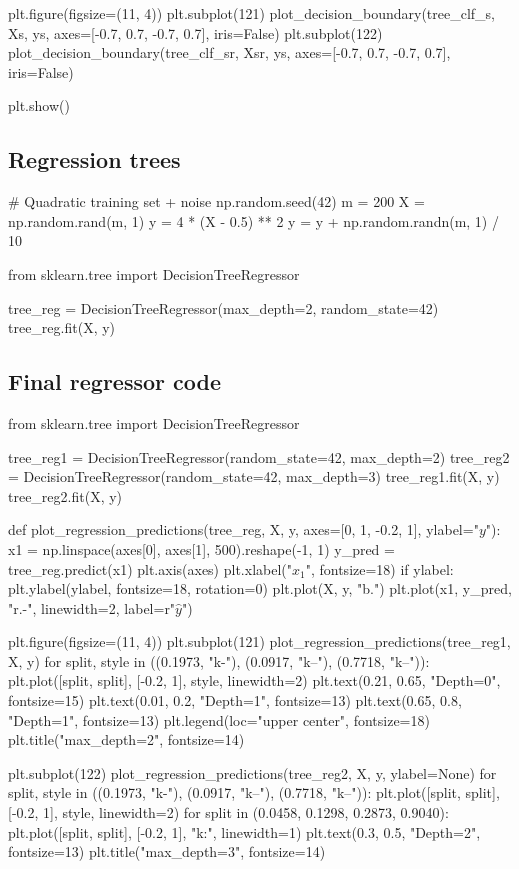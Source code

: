 \documentclass[%
oneside,                 %
final,                   %
10pt]{article}
\begin{document}
plt.figure(figsize=(11, 4))
plt.subplot(121)
plot_decision_boundary(tree_clf_s, Xs, ys, axes=[-0.7, 0.7, -0.7, 0.7], iris=False)
plt.subplot(122)
plot_decision_boundary(tree_clf_sr, Xsr, ys, axes=[-0.7, 0.7, -0.7, 0.7], iris=False)

plt.show()
\epycod

\subsection{Regression trees}
\bpycod
# Quadratic training set + noise
np.random.seed(42)
m = 200
X = np.random.rand(m, 1)
y = 4 * (X - 0.5) ** 2
y = y + np.random.randn(m, 1) / 10
\epycod

\bpycod
from sklearn.tree import DecisionTreeRegressor

tree_reg = DecisionTreeRegressor(max_depth=2, random_state=42)
tree_reg.fit(X, y)
\epycod

\subsection{Final regressor code}
\bpycod
from sklearn.tree import DecisionTreeRegressor

tree_reg1 = DecisionTreeRegressor(random_state=42, max_depth=2)
tree_reg2 = DecisionTreeRegressor(random_state=42, max_depth=3)
tree_reg1.fit(X, y)
tree_reg2.fit(X, y)

def plot_regression_predictions(tree_reg, X, y, axes=[0, 1, -0.2, 1], ylabel="$y$"):
    x1 = np.linspace(axes[0], axes[1], 500).reshape(-1, 1)
    y_pred = tree_reg.predict(x1)
    plt.axis(axes)
    plt.xlabel("$x_1$", fontsize=18)
    if ylabel:
        plt.ylabel(ylabel, fontsize=18, rotation=0)
    plt.plot(X, y, "b.")
    plt.plot(x1, y_pred, "r.-", linewidth=2, label=r"$\hat{y}$")

plt.figure(figsize=(11, 4))
plt.subplot(121)
plot_regression_predictions(tree_reg1, X, y)
for split, style in ((0.1973, "k-"), (0.0917, "k--"), (0.7718, "k--")):
    plt.plot([split, split], [-0.2, 1], style, linewidth=2)
plt.text(0.21, 0.65, "Depth=0", fontsize=15)
plt.text(0.01, 0.2, "Depth=1", fontsize=13)
plt.text(0.65, 0.8, "Depth=1", fontsize=13)
plt.legend(loc="upper center", fontsize=18)
plt.title("max_depth=2", fontsize=14)

plt.subplot(122)
plot_regression_predictions(tree_reg2, X, y, ylabel=None)
for split, style in ((0.1973, "k-"), (0.0917, "k--"), (0.7718, "k--")):
    plt.plot([split, split], [-0.2, 1], style, linewidth=2)
for split in (0.0458, 0.1298, 0.2873, 0.9040):
    plt.plot([split, split], [-0.2, 1], "k:", linewidth=1)
plt.text(0.3, 0.5, "Depth=2", fontsize=13)
plt.title("max_depth=3", fontsize=14)
\end{document}
